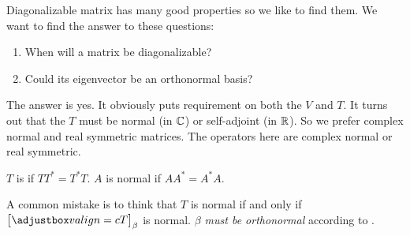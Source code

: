 Diagonalizable matrix has many good properties so we like to find them. We want to find the answer to these questions:
\begin{enumerate}
    \item When will a matrix be diagonalizable?
    \item Could its eigenvector be an orthonormal basis?
\end{enumerate}

The answer is yes. It obviously puts requirement on both the $V$ and $T$. It turns out that the $T$ must be normal (in $\mathbb{C}$) or self-adjoint (in $\mathbb{R}$). So we prefer complex normal and real symmetric matrices. The operators here are complex normal or real symmetric.

\begin{definition}[Normal]\label{normal_definition}
    $T$ is  if $TT^* = T^* T$. $A$ is normal if $AA^* = A^* A$.
\end{definition}

A common mistake is to think that $T$ is normal if and only if $\coordinate{T}_\beta$ is normal. \emph{$\beta$ must be orthonormal} according to .

